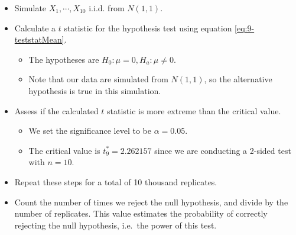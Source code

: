 \documentclass[
]{book}
\providecommand{\tightlist}{%
  \setlength{\itemsep}{0pt}\setlength{\parskip}{0pt}}
\theoremstyle{definition}
\theoremstyle{definition}
\theoremstyle{definition}
\theoremstyle{definition}
\theoremstyle{remark}
\begin{document}
\begin{itemize}
\tightlist
\item
  Simulate \(X_1, \cdots, X_{10}\) i.i.d. from \(N(1,1)\).
\item
  Calculate a \(t\) statistic for the hypothesis test using equation \eqref{eq:9-teststatMean}.

  \begin{itemize}
  \tightlist
  \item
    The hypotheses are \(H_0: \mu = 0, H_a: \mu \neq 0\).
  \item
    Note that our data are simulated from \(N(1,1)\), so the alternative hypothesis is true in this simulation.
  \end{itemize}
\item
  Assess if the calculated \(t\) statistic is more extreme than the critical value.

  \begin{itemize}
  \tightlist
  \item
    We set the significance level to be \(\alpha = 0.05\).
  \item
    The critical value is \(t_9^* = 2.262157\) since we are conducting a 2-sided test with \(n=10\).
  \end{itemize}
\item
  Repeat these steps for a total of 10 thousand replicates.
\item
  Count the number of times we reject the null hypothesis, and divide by the number of replicates. This value estimates the probability of correctly rejecting the null hypothesis, i.e.~the power of this test.
\end{itemize}
\end{document}
